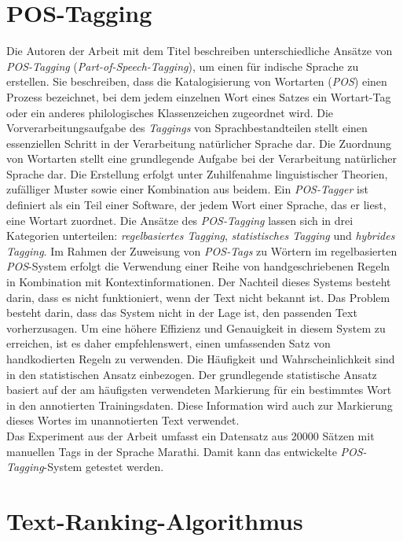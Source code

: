 \section{POS-Tagging}
Die Autoren \citeauthor{kumawat2015pos} der Arbeit mit dem Titel \cite{kumawat2015pos} beschreiben unterschiedliche Ansätze von \emph{POS-Tagging} (\emph{Part-of-Speech-Tagging}), um einen für indische Sprache zu erstellen. Sie beschreiben, dass die Katalogisierung von Wortarten (\emph{POS}) einen Prozess bezeichnet, bei dem jedem einzelnen Wort eines Satzes ein Wortart-Tag oder ein anderes philologisches Klassenzeichen zugeordnet wird. Die Vorverarbeitungsaufgabe des \emph{Taggings} von Sprachbestandteilen stellt einen essenziellen Schritt in der Verarbeitung natürlicher Sprache dar. Die Zuordnung von Wortarten stellt eine grundlegende Aufgabe bei der Verarbeitung natürlicher Sprache dar. Die Erstellung erfolgt unter Zuhilfenahme linguistischer Theorien, zufälliger Muster sowie einer Kombination aus beidem. Ein \emph{POS-Tagger} ist definiert als ein Teil einer Software, der jedem Wort einer Sprache, das er liest, eine Wortart zuordnet. Die Ansätze des \emph{POS-Tagging} lassen sich in drei Kategorien unterteilen: \emph{regelbasiertes Tagging}, \emph{statistisches Tagging} und \emph{hybrides Tagging}. Im Rahmen der Zuweisung von \emph{POS-Tags} zu Wörtern im regelbasierten \emph{POS}-System erfolgt die Verwendung einer Reihe von handgeschriebenen Regeln in Kombination mit Kontextinformationen. Der Nachteil dieses Systems besteht darin, dass es nicht funktioniert, wenn der Text nicht bekannt ist. Das Problem besteht darin, dass das System nicht in der Lage ist, den passenden Text vorherzusagen. Um eine höhere Effizienz und Genauigkeit in diesem System zu erreichen, ist es daher empfehlenswert, einen umfassenden Satz von handkodierten Regeln zu verwenden. Die Häufigkeit und Wahrscheinlichkeit sind in den statistischen Ansatz einbezogen. Der grundlegende statistische Ansatz basiert auf der am häufigsten verwendeten Markierung für ein bestimmtes Wort in den annotierten Trainingsdaten. Diese Information wird auch zur Markierung dieses Wortes im unannotierten Text verwendet.\\
Das Experiment aus der Arbeit umfasst ein Datensatz aus 20000 Sätzen mit manuellen Tags in der Sprache Marathi. Damit kann das entwickelte \emph{POS-Tagging}-System getestet werden. 

\section{Text-Ranking-Algorithmus}

